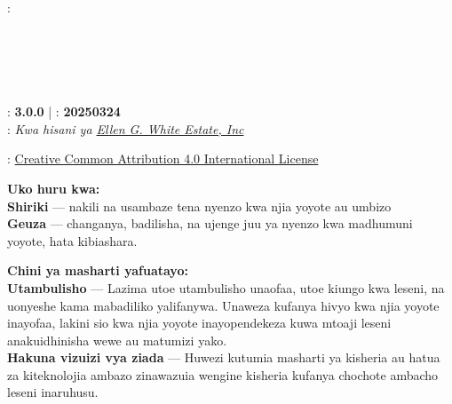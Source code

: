 \clearpage %

{\small
\setlength{\parindent}{0em}\setlength{\parskip}{1em}

{\large \emcap{\booktitle}}

\ifx\originaltitle\undefined\else\if\relax\detokenize\expandafter{\originaltitle}\relax{} \\ \fi\fi
{}: \textbf{\authorname} \\
\ifx\editor\undefined\else\if\relax\detokenize\expandafter{\editor}\relax{} \\ \fi\fi
\ifx\translatedby\undefined\else\if\relax\detokenize\expandafter{\translatedby}\relax{} \\ \fi\fi
\ifx\publisher\undefined\else\if\relax\detokenize\expandafter{\publisher}\relax{} \\ \fi\fi
\ifx\publishingplace\undefined\else\if\relax\detokenize\expandafter{\publishingplace}\relax{} \\ \fi\fi
\ifx\isbn\undefined\else\if\relax\detokenize\expandafter{\isbn}\relax{} \\ \fi\fi
{}: \textbf{3.0.0} | : \textbf{20250324} \\
: \textit{Kwa hisani ya \href{https://ellenwhite.org/}{Ellen G. White Estate, Inc}}

\vfill

: \ifepub\else\ccby{}\fi \href{https://creativecommons.org/licenses/by/4.0/}{Creative Common Attribution 4.0 International License}

\textbf{Uko huru kwa:} \\
\textbf{Shiriki} — nakili na usambaze tena nyenzo kwa njia yoyote au
umbizo \\
\textbf{Geuza} — changanya, badilisha, na ujenge juu ya nyenzo kwa madhumuni yoyote, hata kibiashara.

\textbf{Chini ya masharti yafuatayo:} \\
\textbf{Utambulisho} — Lazima utoe utambulisho unaofaa, utoe kiungo kwa leseni, na uonyeshe kama mabadiliko yalifanywa. Unaweza kufanya hivyo kwa njia yoyote inayofaa, lakini sio kwa njia yoyote inayopendekeza kuwa mtoaji leseni anakuidhinisha wewe au matumizi yako. \\
\textbf{Hakuna vizuizi vya ziada} — Huwezi kutumia masharti ya kisheria au hatua za kiteknolojia ambazo zinawazuia wengine kisheria kufanya chochote ambacho leseni inaruhusu.

}
